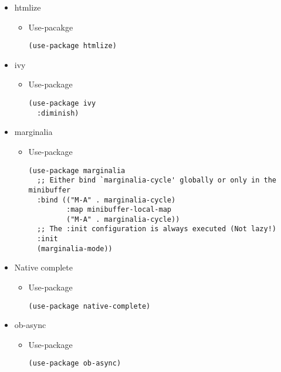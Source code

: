 \documentclass{article}
\begin{document}
\begin{itemize}
\begin{itemize}
\begin{verbatim}
\end{verbatim}
\end{itemize}

\item htmlize
\label{sec:org79d5b75}

\begin{itemize}
\item Use-pacakge
\label{sec:org01ca27f}
\begin{verbatim}
(use-package htmlize)
\end{verbatim}
\end{itemize}

\item ivy
\label{sec:orgf2d8c19}
\begin{itemize}
\item Use-package
\label{sec:org70f19f7}
\begin{verbatim}
(use-package ivy
  :diminish)
\end{verbatim}
\end{itemize}

\item marginalia
\label{sec:org9f2bcff}
\begin{itemize}
\item Use-package
\label{sec:orge168497}
\begin{verbatim}
(use-package marginalia
  ;; Either bind `marginalia-cycle' globally or only in the minibuffer
  :bind (("M-A" . marginalia-cycle)
         :map minibuffer-local-map
         ("M-A" . marginalia-cycle))
  ;; The :init configuration is always executed (Not lazy!)
  :init
  (marginalia-mode))
\end{verbatim}
\end{itemize}

\item Native complete
\label{sec:org6f4e2bc}
\begin{itemize}
\item Use-package
\label{sec:org03f3ea9}
\begin{verbatim}
(use-package native-complete)
\end{verbatim}
\end{itemize}
\item ob-async
\label{sec:org9ba22f0}

\begin{itemize}
\item Use-package
\label{sec:org8daf522}
\begin{verbatim}
(use-package ob-async)
\end{verbatim}
\end{itemize}


\end{itemize}
\end{document}
